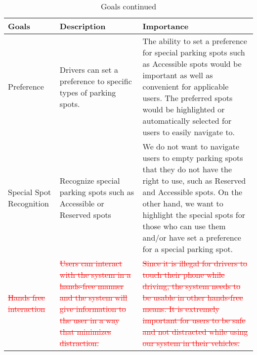 \documentclass[12pt,letterpaper]{article}
\begin{document}
\begin{table}[hp]
\begin{tabularx}{\textwidth}{|X|X|X|}
\toprule
\textbf{Goals} & \textbf{Description} & \textbf{Importance}\\
\midrule
Preference & Drivers can set a preference to specific types of parking spots. &
The ability to set a preference for special parking spots such as Accessible
spots would be important as well as convenient for applicable users. The
preferred spots would be highlighted or automatically selected for users to
easily navigate to.\\
\hline
Special Spot Recognition & Recognize special parking spots such as Accessible or
Reserved spots & We do not want to navigate users to empty parking spots that
they do not have the right to use, such as Reserved and Accessible spots. On the
other hand, we want to highlight the special spots for those who can use them
and/or have set a preference for a special parking spot. \\
\hline
\textcolor{red}{\st{Hands free interaction}} & \textcolor{red}{\st{Users can
interact with the system in a hands-free manner and the system will give
information to the user in a way that minimizes distraction.}} &
\textcolor{red}{\st{Since it is illegal for drivers to touch their phone while
driving, the system needs to be usable in other hands-free means. It is
extremely important for users to be safe and not distracted while using our
system in their vehicles.}}\\
\bottomrule
\end{tabularx}
\caption{Goals continued} \label{TblGoals} 
\end{table}


\newpage

\end{document}
